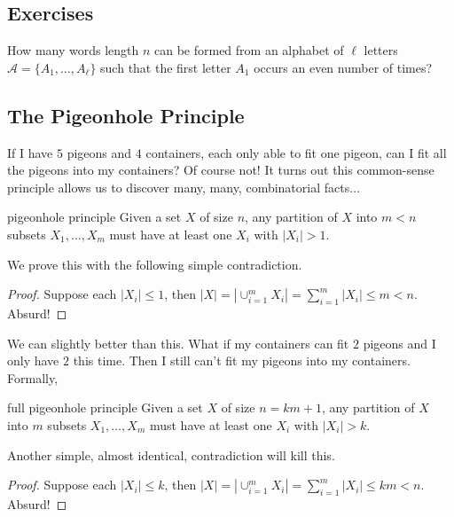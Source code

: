 \documentclass{article}
\begin{document}
\subsection*{Exercises}

\begin{exercise}[]{}
    How many words length $n$ can be formed from an alphabet of $\ell$ letters $\mathcal{A} = \{A_1, \dots, A_\ell\}$ such that the first letter 
    $A_1$ occurs an even number of times?
\end{exercise}

\subsection{The Pigeonhole Principle}

If I have $5$ pigeons and $4$ containers, each only able to fit one pigeon, can I fit all the pigeons into my containers? Of course not! It turns 
out this common-sense principle allows us to discover many, many, combinatorial facts$\dots$

\begin{theorem}[]{pigeonhole principle}
    Given a set $X$ of size $n$, any partition of $X$ into $m < n$ subsets $X_1, \dots, X_m$ must have at least one $X_i$ with $|X_i| > 1$. 
\end{theorem}

We prove this with the following simple contradiction. 

\begin{proof}
    Suppose each $|X_i| \leq 1$, then $|X| = |\cup_{i=1}^m X_i| = \sum_{i=1}^m |X_i| \leq m < n$. Absurd!
\end{proof}

We can slightly better than this. What if my containers can fit $2$ pigeons and I only have $2$ this time. Then I still can't fit my pigeons 
into my containers. Formally, 

\begin{theorem}[]{full pigeonhole principle}
    Given a set $X$ of size $n = km+1$, any partition of $X$ into $m$ subsets $X_1, \dots, X_m$ must have at least one $X_i$ with $|X_i| > k$.
\end{theorem}

Another simple, almost identical, contradiction will kill this. 

\begin{proof}
    Suppose each $|X_i| \leq k$, then $|X| = |\cup_{i=1}^m X_i| = \sum_{i=1}^m |X_i| \leq km < n$. Absurd!
\end{proof}
\end{document}

